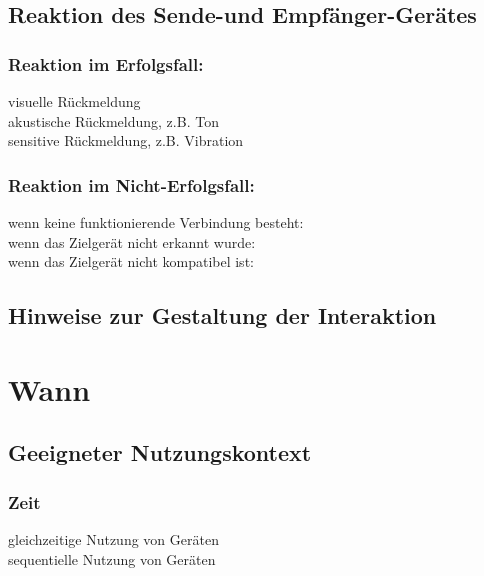 \subsection*{Reaktion des Sende-und Empfänger-Gerätes}
\reaction

\subsubsection*{Reaktion im Erfolgsfall:}
\checkbox{\reactionSuccessVisual} visuelle Rückmeldung \\
\checkbox{\reactionSuccessAcustic} akustische Rückmeldung, z.B. Ton \\
\checkbox{\reactionSuccessSensitive} sensitive Rückmeldung, z.B. Vibration

\subsubsection*{Reaktion im Nicht-Erfolgsfall:}
\checkbox{\reactionFailureConnection} wenn keine funktionierende Verbindung besteht: \reactionFailureConnectionDesc \\
\checkbox{\reactionFailureNoDevice} wenn das Zielgerät nicht erkannt wurde: \reactionFailureNoDeviceDesc \\
\checkbox{\reactionFailureCompatibility} wenn das Zielgerät nicht kompatibel ist: \reactionFailureCompatibilityDesc

\subsection*{Hinweise zur Gestaltung der Interaktion}
\designnotes


\section*{Wann}

\subsection*{Geeigneter Nutzungskontext}
\validcontext

\subsubsection*{Zeit}
\checkbox{\simultaneously} gleichzeitige Nutzung von Geräten \\
\checkbox{\sequentially} sequentielle Nutzung von Geräten 

